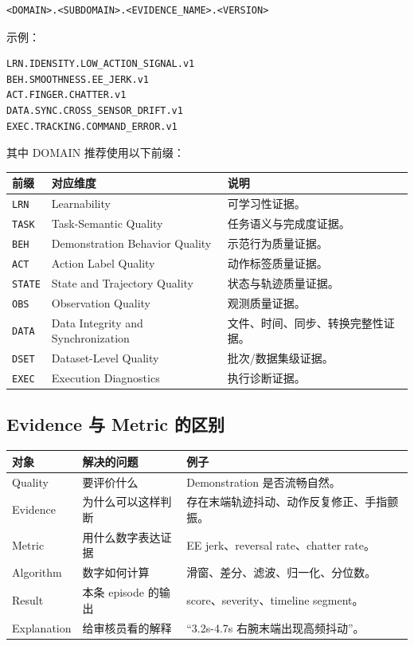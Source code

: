 \documentclass[UTF8,zihao=-4,oneside,openany]{ctexrep}
\newcommand{\Code}[1]{\texttt{#1}}
\begin{document}
\begin{verbatim}
<DOMAIN>.<SUBDOMAIN>.<EVIDENCE_NAME>.<VERSION>
\end{verbatim}

示例：

\begin{verbatim}
LRN.IDENSITY.LOW_ACTION_SIGNAL.v1
BEH.SMOOTHNESS.EE_JERK.v1
ACT.FINGER.CHATTER.v1
DATA.SYNC.CROSS_SENSOR_DRIFT.v1
EXEC.TRACKING.COMMAND_ERROR.v1
\end{verbatim}

其中 DOMAIN 推荐使用以下前缀：

\begin{longtable}{L{2.5cm} L{4.2cm} L{6.5cm}}
\toprule
前缀 & 对应维度 & 说明 \\
\midrule
\Code{LRN} & Learnability & 可学习性证据。 \\
\Code{TASK} & Task-Semantic Quality & 任务语义与完成度证据。 \\
\Code{BEH} & Demonstration Behavior Quality & 示范行为质量证据。 \\
\Code{ACT} & Action Label Quality & 动作标签质量证据。 \\
\Code{STATE} & State and Trajectory Quality & 状态与轨迹质量证据。 \\
\Code{OBS} & Observation Quality & 观测质量证据。 \\
\Code{DATA} & Data Integrity and Synchronization & 文件、时间、同步、转换完整性证据。 \\
\Code{DSET} & Dataset-Level Quality & 批次/数据集级证据。 \\
\Code{EXEC} & Execution Diagnostics & 执行诊断证据。 \\
\bottomrule
\end{longtable}

\subsection{Evidence 与 Metric 的区别}

\begin{longtable}{L{3.2cm} L{5.1cm} L{5.5cm}}
\toprule
对象 & 解决的问题 & 例子 \\
\midrule
Quality & 要评价什么 & Demonstration 是否流畅自然。 \\
Evidence & 为什么可以这样判断 & 存在末端轨迹抖动、动作反复修正、手指颤振。 \\
Metric & 用什么数字表达证据 & EE jerk、reversal rate、chatter rate。 \\
Algorithm & 数字如何计算 & 滑窗、差分、滤波、归一化、分位数。 \\
Result & 本条 episode 的输出 & score、severity、timeline segment。 \\
Explanation & 给审核员看的解释 & “3.2s-4.7s 右腕末端出现高频抖动”。 \\
\bottomrule
\end{longtable}
\end{document}
